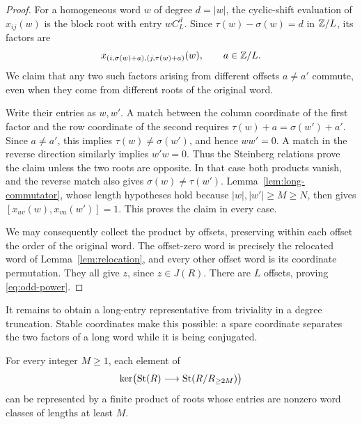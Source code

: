 \begin{proof}
For a homogeneous word $w$ of degree $d=|w|$, the cyclic-shift
evaluation of $x_{ij}(w)$ is the block root with entry $wC_L^d$.
Since $\tau(w)-\sigma(w)=d$ in $\mathbb Z/L$, its factors are
\begin{equation}\label{eq:offset-factors}
 x_{(i,\sigma(w)+a),(j,\tau(w)+a)}(w),
 \qquad a\in\mathbb Z/L.
\end{equation}
We claim that any two such factors arising from different offsets
$a\ne a'$ commute, even when they come from different roots of the
original word.

Write their entries as $w,w'$. A match between the column coordinate
of the first factor and the row coordinate of the second requires
$\tau(w)+a=\sigma(w')+a'$. Since $a\ne a'$, this implies
$\tau(w)\ne\sigma(w')$, and hence $ww'=0$.
A match in the reverse direction similarly implies $w'w=0$.
Thus the Steinberg relations prove the claim unless the two roots
are opposite. In that case both products vanish, and the reverse
match also gives $\sigma(w)\ne\tau(w')$.
Lemma~\ref{lem:long-commutator}, whose length hypotheses hold
because $|w|,|w'|\ge M\ge N$, then gives
$[x_{uv}(w),x_{vu}(w')]=1$. This proves the claim in every case.

We may consequently collect the product by offsets, preserving
within each offset the order of the original word. The offset-zero
word is precisely the relocated word of
Lemma~\ref{lem:relocation}, and every other offset word is its
coordinate permutation. They all give $z$, since $z\in J(R)$.
There are $L$ offsets, proving \eqref{eq:odd-power}.
\end{proof}

It remains to obtain a long-entry representative from triviality in
a degree truncation. Stable coordinates make this possible: a spare
coordinate separates the two factors of a long word while it is
being conjugated.

\begin{lemma}\label{lem:high-entries}
For every integer $M\ge1$, each element of
\[
 \ker\bigl(\operatorname{St}(R)\longrightarrow\operatorname{St}(R/R_{\ge2M})\bigr)
\]
can be represented by a finite product of roots whose entries are
nonzero word classes of lengths at least $M$.
\end{lemma}

